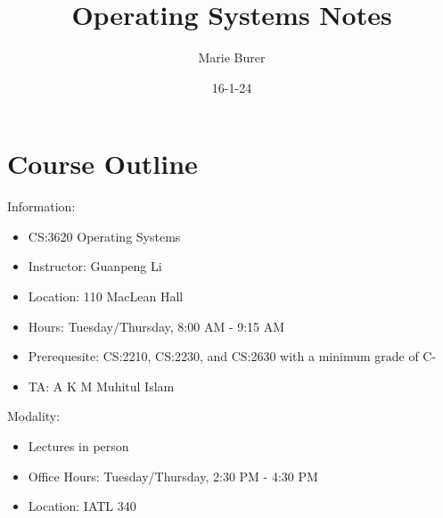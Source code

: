 \documentclass[12pt]{article}
\title{Operating Systems Notes}
\author{Marie Burer}
\date{16-1-24}
\begin{document}
\maketitle
\newpage
\setlength{\parindent}{0pt}

\tableofcontents

\newpage

\section*{Course Outline}

Information:
\begin{itemize}
    \item CS:3620 Operating Systems
    \item Instructor: Guanpeng Li
    \item Location: 110 MacLean Hall
    \item Hours: Tuesday/Thursday, 8:00 AM - 9:15 AM
    \item Prerequesite: CS:2210, CS:2230, and CS:2630 with a minimum grade of C-
    \item TA: A K M Muhitul Islam
\end{itemize}

Modality:
\begin{itemize}
    \item Lectures in person
    \item Office Hours: Tuesday/Thursday, 2:30 PM - 4:30 PM
    \item Location: IATL 340
\end{itemize}
\end{document}
